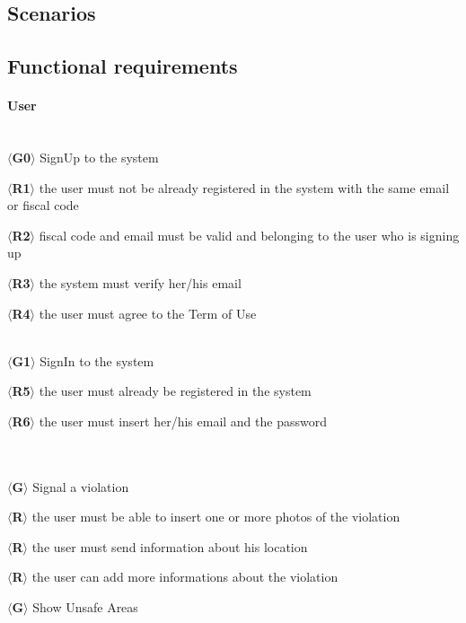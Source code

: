 \documentclass{article}
\begin{document}
\subsection{Scenarios}
\subsection{Functional requirements}
\paragraph{User}\mbox{}\\
$\langle$\textbf{G0}$\rangle$ SignUp to the system
\begin{description}
    \item $\langle$\textbf{R1}$\rangle$ the user must not be already registered
    in the system with the same email or fiscal code
    \item $\langle$\textbf{R2}$\rangle$ fiscal code and email must be valid and
    belonging to the user who is signing up
    \item $\langle$\textbf{R3}$\rangle$ the system must verify her/his email
    \item $\langle$\textbf{R4}$\rangle$ the user must agree to the Term of Use
\end{description}\mbox{}\\
$\langle$\textbf{G1}$\rangle$ SignIn to the system
\begin{description}
    \item $\langle$\textbf{R5}$\rangle$ the user must already be registered in
    the system
    \item $\langle$\textbf{R6}$\rangle$ the user must insert her/his email and
    the password \end{description}\mbox{}\\\\
$\langle$\textbf{G}$\rangle$ Signal a violation
\begin{description}
    \item $\langle$\textbf{R}$\rangle$ the user must be able to insert one or
    more photos of the violation
    \item $\langle$\textbf{R}$\rangle$ the user must send information about his
    location
    \item $\langle$\textbf{R}$\rangle$ the user can add more informations about
    the violation
\end{description}
$\langle$\textbf{G}$\rangle$ Show Unsafe Areas
\end{document}
